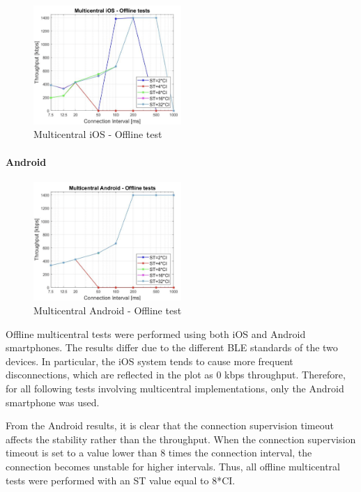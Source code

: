 \documentclass{Configuration_Files/PoliMi3i_thesis}
\begin{document}
\begin{figure}[H]
    \centering
    \includegraphics[width=0.5\textwidth]{Results Manuel/figure25}
    \caption{Multicentral iOS - Offline test}
    \label{manuel_results_25}
\end{figure}

\paragraph{Android}

\begin{figure}[H]
    \centering
    \includegraphics[width=0.5\textwidth]{Results Manuel/figure26}
    \caption{Multicentral Android - Offline test}
    \label{manuel_results_26}
\end{figure}

Offline multicentral tests were performed using both iOS and Android smartphones. The results differ due to the different BLE standards of the two devices. In particular, the iOS system tends to cause more frequent disconnections, which are reflected in the plot as 0 kbps throughput. Therefore, for all following tests involving multicentral implementations, only the Android smartphone was used.

From the Android results, it is clear that the connection supervision timeout affects the stability rather than the throughput. When the connection supervision timeout is set to a value lower than 8 times the connection interval, the connection becomes unstable for higher intervals. Thus, all offline multicentral tests were performed with an ST value equal to 8*CI.
\end{document}
